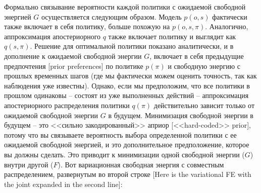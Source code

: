 \documentclass[twoside,leqno, 11pt]{article}
\begin{document}
	
	Формально связывание вероятности каждой политики с ожидаемой свободной энергией $G$ осуществляется следующим образом. Модель $p(o,s)$ фактически также включает в себя политику, больше похожую на $p(o,s,\pi)$. Аналогично, аппроксимация апостериорного $q$ также включает политику и выглядит как $q(s,\pi)$. Решение для оптимальной политики показано аналитически, и в дополнение к ожидаемой свободной энергии $G$, включает в себя предыдущие предпочтения [prior preferences] по политике $p(\pi)$ и свободную энергию с прошлых временных шагов (где мы фактически можем оценить точность, так как наблюдения уже известны). Однако, если мы предположим, что все политики в прошлом одинаковы -- состоят из уже выполненных действий -- аппроксимация апостериорного распределения политики $q(\pi)$ действительно зависит только от ожидаемой свободной энергии $G$ в будущем. Минимизация свободной энергии в будущем -- это <<сильно закодированный>> априор [<<hard-coded>> prior], потому что вы связываете вероятность выбора определенной политики с ее ожидаемой свободной энергией, и это дополнительное предположение, которое вы должны сделать. Это приводит к минимизации одной свободной энергии ($G$) внутри другой ($F$). Вот вариационная свободная энергия с совместным распределением, развернутым во второй строке [Here is the variational FE with the joint expanded in the second line]:
	
	
\end{document}
